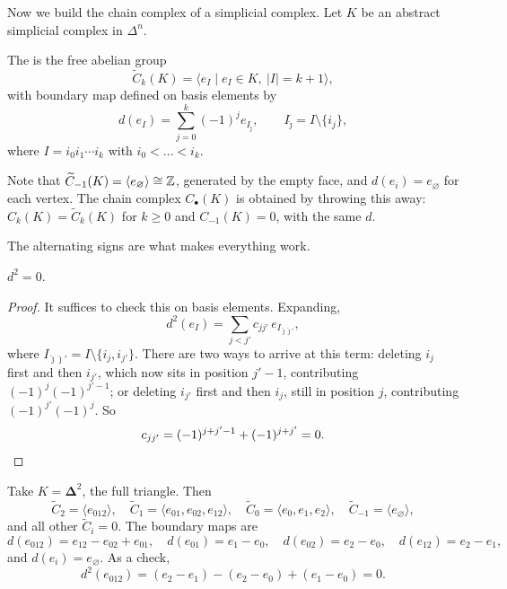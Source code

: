 \documentclass[a4paper]{scrartcl}
\newcommand{\genby}[1]{\langle #1 \rangle}
\newcommand{\bDelta}{\boldsymbol{\Delta}}
\begin{document}
Now we build the chain complex of a simplicial complex. Let $K$ be an abstract simplicial
complex in $\Delta^n$.

\begin{definition}
	The  is the free abelian group
	$$
	\widetilde C_k(K) = \genby{e_I \mid e_I \in K, \ |I| = k+1},
	$$
	with boundary map defined on basis elements by
	$$
	d(e_I) = \sum_{j=0}^{k}(-1)^j e_{I_{\hat\jmath}}, \qquad I_{\hat\jmath} = I \setminus \{i_j\},
	$$
	where $I = i_0i_1\cdots i_k$ with $i_0 < \dots < i_k$.
\end{definition}

Note that $\widetilde C_{-1}(K) = \genby{e_\varnothing} \cong \Z$, generated by the empty
face, and $d(e_i) = e_\varnothing$ for each vertex. The  chain complex
$C_\bullet(K)$ is obtained by throwing this away: $C_k(K) = \widetilde C_k(K)$ for
$k \geq 0$ and $C_{-1}(K) = 0$, with the same $d$.

The alternating signs are what makes everything work.

\begin{proposition}
	$d^2 = 0$.
\end{proposition}
\begin{proof}
	It suffices to check this on basis elements. Expanding,
	$$
	d^2(e_I) = \sum_{j < j'} c_{jj'}\, e_{I_{\hat\jmath\hat\jmath'}},
	$$
	where $I_{\hat\jmath\hat\jmath'} = I \setminus \{i_j, i_{j'}\}$. There are two ways to arrive at this term: deleting $i_j$ first and then $i_{j'}$, which now sits in position $j'-1$, contributing $(-1)^j(-1)^{j'-1}$; or deleting $i_{j'}$ first and then $i_j$, still in position $j$, contributing $(-1)^{j'}(-1)^j$. So
	$$
	c_{jj'} = (-1)^{j+j'-1} + (-1)^{j+j'} = 0. \qedhere
	$$
\end{proof}

\begin{example} \label{ex:chain-delta2}
	Take $K = \bDelta^2$, the full triangle. Then
	$$
	\widetilde C_2 = \genby{e_{012}},\quad \widetilde C_1 = \genby{e_{01},e_{02},e_{12}},\quad \widetilde C_0 = \genby{e_0,e_1,e_2},\quad \widetilde C_{-1} = \genby{e_\varnothing},
	$$
	and all other $\widetilde C_i = 0$. The boundary maps are
	$$
	d(e_{012}) = e_{12}-e_{02}+e_{01}, \quad d(e_{01}) = e_1-e_0,\quad d(e_{02}) = e_2 - e_0, \quad d(e_{12}) = e_2 - e_1,
	$$
	and $d(e_i) = e_\varnothing$. As a check,
	$$
	d^2(e_{012}) = (e_2-e_1)-(e_2-e_0)+(e_1-e_0) = 0.
	$$
\end{example}
\end{document}
